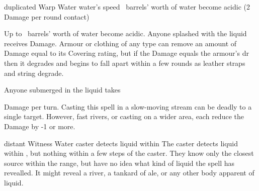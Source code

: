   {duplicated}%
  {Warp}%
  {Water}%
  {water's speed}%
  {\spellArea\ barrels' worth of water become acidic (2 Damage per round contact)}%
  {
    Up to \spellArea\ barrels' worth of water become acidic.
    Anyone splashed with the liquid receives  Damage. 
    Armour or clothing of any type can remove an amount of Damage equal to its Covering rating, but if the Damage equals the armour's \gls{dr} then it degrades and begins to fall apart within a few rounds as leather straps and string degrade.

    Anyone submerged in the liquid takes \addtocounter{spelllevel}{2}  Damage per turn.
    Casting this spell in a slow-moving stream can be deadly to a single target.
    However, fast rivers, or casting on a wider area, each reduce the Damage by -1 or more.
  }

  {distant}%
  {Witness}%
  {Water}%
  {}%
  {caster detects liquid within \spellRange}%
  {
    The caster detects liquid within \spellRange, but nothing within a few steps of the caster.
    They know only the closest source within the range, but have no idea what kind of liquid the spell has revealled.
    It might reveal a river, a tankard of ale, or any other body apparent of liquid.
  }
